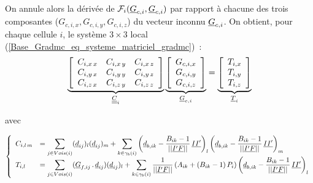 On annule alors la d\'eriv\'ee de
$\mathcal{F}_i(\underline{G}_{c,i},\underline{G}_{c,i})$
par rapport \`a
chacune des trois composantes ($G_{c,i,x}, G_{c,i,y}, G_{c,i,z}$) du vecteur
inconnu $\underline{G}_{c,i}$. On
obtient, pour chaque cellule $i$, le syst\`eme $3\times3$ local
(\ref{Base_Gradmc_eq_systeme_matriciel_gradmc})~:
\begin{equation}\label{Base_Gradmc_eq_systeme_matriciel_gradmc}
\underbrace{
\left[\begin{array}{ccc}
\displaystyle
C_{i,x\,x}
& C_{i,x\,y}
& C_{i,x\,z}\\
\displaystyle
C_{i,y\,x}
& C_{i,y\,y}
& C_{i,y\,z}\\
\displaystyle
C_{i,z\,x}
& C_{i,z\,y}
& C_{i,z\,z}
\end{array}\right]
}_{\underline{\underline{C}}_i}
\underbrace{
\left[\begin{array}{c}
G_{c,i,x} \\ G_{c,i,y} \\ G_{c,i,z}
\end{array}\right]
}_{\underline{G}_{c,i}}
=
\underbrace{
\left[\begin{array}{c}
\displaystyle
T_{i,x}\\
\displaystyle
T_{i,y}\\
\displaystyle
T_{i,z}
\end{array}\right]
}_{\underline{T}_{i}}
\end{equation}

avec


\begin{equation}
\left\{\begin{array}{ll}
C_{i,l\,m} &=\displaystyle
 \sum\limits_{j\in Vois(i)}(\underline{d}_{ij})_{l}(\underline{d}_{ij})_{m}
+\sum\limits_{k\in\gamma_b(i)}\left(\underline{d}_{b,ik}-\frac{B_{ik}-1}{||\underline{I'F}||}\,\underline{II'}\right)_{l}
                              \left(\underline{d}_{b,ik}-\frac{B_{ik}-1}{||\underline{I'F}||}\,\underline{II'}\right)_{m} \\
T_{i,l} &=\displaystyle
 \sum\limits_{j\in Vois(i)}(\underline{G}_{f,ij}\,.\,\underline{d}_{ij})(\underline{d}_{ij})_l
+\sum\limits_{k\in \gamma_b(i)}\frac{1}{||\underline{I'F}||}\left(A_{ik}+(B_{ik}-1)\,P_{i}\right)
                              \left(\underline{d}_{b,ik}-\frac{B_{ik}-1}{||\underline{I'F}||}\,\underline{II'}\right)_l
\end{array}\right.
\end{equation}

